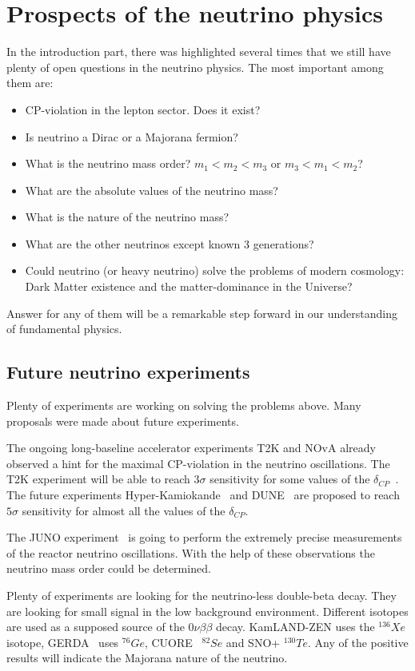 \documentclass[../main.tex]{subfiles}
\begin{document}
\chapter{Prospects of the neutrino physics}
In the introduction part, there was highlighted several times that we still have plenty of open questions in the neutrino physics. The most important among them are:
\begin{itemize}
  \item CP-violation in the lepton sector. Does it exist?
  \item Is neutrino a Dirac or a Majorana fermion?
  \item What is the neutrino mass order? $m_1<m_2<m_3$ or $m_3<m_1<m_2$?
  \item What are the absolute values of the neutrino mass?
  \item What is the nature of the neutrino mass?
  \item What are the other neutrinos except known 3 generations?
  \item Could neutrino (or heavy neutrino) solve the problems of modern cosmology: Dark Matter existence and the matter-dominance in the Universe?
\end{itemize}

Answer for any of them will be a remarkable step forward in our understanding of fundamental physics.

\section{Future neutrino experiments}
\label{intro:future}
Plenty of experiments are working on solving the problems above. Many proposals were made about future experiments.

The ongoing long-baseline accelerator experiments T2K and NOvA already observed a hint for the maximal CP-violation in the neutrino oscillations. The T2K experiment will be able to reach $3\sigma$ sensitivity for some values of the $\delta_{CP}$~\cite{Abe2016e}. The future experiments Hyper-Kamiokande~\cite{Proto-Collaboration2018} and DUNE~\cite{Acciarri2016} are proposed to reach $5\sigma$ sensitivity for almost all the values of the $\delta_{CP}$.

The JUNO experiment~\cite{Cerna2020} is going to perform the extremely precise measurements of the reactor neutrino oscillations. With the help of these observations the neutrino mass order could be determined.

Plenty of experiments are looking for the neutrino-less double-beta decay. They are looking for small signal in the low background environment. Different isotopes are used as a supposed source of the $0\nu\beta\beta$ decay. KamLAND-ZEN uses the ${}^{136}Xe$ isotope, GERDA~\cite{DiMarco2020} uses ${}^{76}Ge$, CUORE~\cite{Cardani2020} ${}^{82}Se$ and SNO+ ${}^{130}Te$. Any of the positive results will indicate the Majorana nature of the neutrino.
\end{document}
